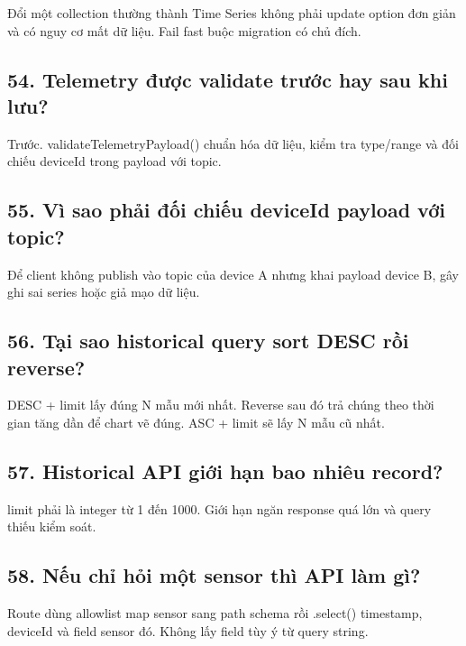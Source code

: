 \documentclass[11pt,oneside,openany]{book}
\renewcommand{\texttt}[1]{{\ttfamily\small #1}}
\begin{document}
Đổi một collection thường thành Time Series không phải update option đơn
giản và có nguy cơ mất dữ liệu. Fail fast buộc migration có chủ đích.

\subsection{54. Telemetry được validate trước hay sau khi
lưu?}\label{54-telemetry-ux111ux1b0ux1ee3c-validate-trux1b0ux1edbc-hay-sau-khi-lux1b0u}

Trước. \texttt{validateTelemetryPayload()} chuẩn hóa dữ liệu, kiểm tra
type/range và đối chiếu deviceId trong payload với topic.

\subsection{55. Vì sao phải đối chiếu deviceId payload với
topic?}\label{55-vuxec-sao-phux1ea3i-ux111ux1ed1i-chiux1ebfu-deviceid-payload-vux1edbi-topic}

Để client không publish vào topic của device A nhưng khai payload device
B, gây ghi sai series hoặc giả mạo dữ liệu.

\subsection{56. Tại sao historical query sort DESC rồi
reverse?}\label{56-tux1ea1i-sao-historical-query-sort-desc-rux1ed3i-reverse}

DESC + limit lấy đúng N mẫu mới nhất. Reverse sau đó trả chúng theo thời
gian tăng dần để chart vẽ đúng. ASC + limit sẽ lấy N mẫu cũ nhất.

\subsection{57. Historical API giới hạn bao nhiêu
record?}\label{57-historical-api-giux1edbi-hux1ea1n-bao-nhiuxeau-record}

\texttt{limit} phải là integer từ 1 đến 1000. Giới hạn ngăn response quá
lớn và query thiếu kiểm soát.

\subsection{58. Nếu chỉ hỏi một sensor thì API làm
gì?}\label{58-nux1ebfu-chux1ec9-hux1ecfi-mux1ed9t-sensor-thuxec-api-luxe0m-guxec}

Route dùng allowlist map sensor sang path schema rồi \texttt{.select()}
timestamp, deviceId và field sensor đó. Không lấy field tùy ý từ query
string.
\end{document}
